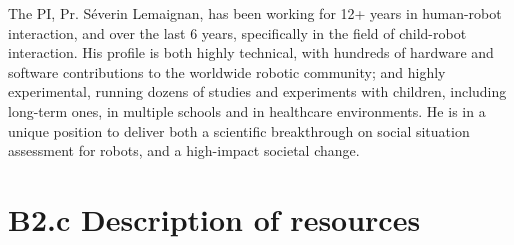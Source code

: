 \documentclass[11pt,a4paper]{report}
\begin{document}
The PI, Pr. Séverin Lemaignan, has been working for 12+
years in human-robot interaction, and over the last 6 years, specifically in the
field of child-robot interaction.  His profile is both highly technical, with
hundreds of hardware and software contributions to the worldwide robotic
community; and highly experimental, running dozens of studies and experiments
with children, including long-term ones, in multiple schools and in healthcare
environments. He is in a unique position to deliver both a scientific
breakthrough on social situation assessment for robots, and a high-impact
societal change.






\newpage
\printbibliography

\newrefsection
\newpage
\chapter{B2.c Description of resources}
\end{document}
